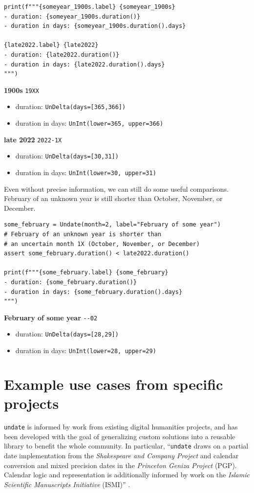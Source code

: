 \documentclass[final]{anthology-ch} %
\begin{document}
\begin{verbatim}
print(f"""{someyear_1900s.label} {someyear_1900s}
- duration: {someyear_1900s.duration()}
- duration in days: {someyear_1900s.duration().days}

{late2022.label} {late2022}
- duration: {late2022.duration()}
- duration in days: {late2022.duration().days}
""")
\end{verbatim}

\noindent
\textbf{1900s} \texttt{19XX}
\begin{itemize}
    \item duration: \texttt{UnDelta(days=[365,366])}
    \item duration in days: \texttt{UnInt(lower=365, upper=366)}
\end{itemize}

\noindent
\textbf{late 2022} \texttt{2022-1X}
\begin{itemize}
    \item duration: \texttt{UnDelta(days=[30,31])}
    \item duration in days: \texttt{UnInt(lower=30, upper=31)}
\end{itemize}
    
Even without precise information, we can still do some useful comparisons. February of an unknown year is still shorter than October, November, or December.

\begin{verbatim}
some_february = Undate(month=2, label="February of some year")
# February of an unknown year is shorter than 
# an uncertain month 1X (October, November, or December) 
assert some_february.duration() < late2022.duration()

print(f"""{some_february.label} {some_february}
- duration: {some_february.duration()}
- duration in days: {some_february.duration().days}
""")

\end{verbatim}

\noindent
\textbf{February of some year} \texttt{{-}{-02}}
\begin{itemize}
    \item duration: \texttt{UnDelta(days=[28,29])}
    \item duration in days: \texttt{UnInt(lower=28, upper=29)}
\end{itemize}
    
\section{Example use cases from specific projects}\label{example-use-cases-from-specific-projects}
\texttt{undate} is informed by work from existing digital humanities projects, and has been developed with the goal of generalizing custom solutions into a reusable library to benefit the whole community. In particular, ``\texttt{undate} draws on a partial date implementation from the \textit{Shakespeare and Company Project} and calendar conversion and mixed precision dates in the \textit{Princeton Geniza Project} (PGP). Calendar logic and representation is additionally informed by work on the \textit{Islamic Scientific Manuscripts Initiative} (ISMI)'' \cite{koeser_undate_2025}.
\end{document}

